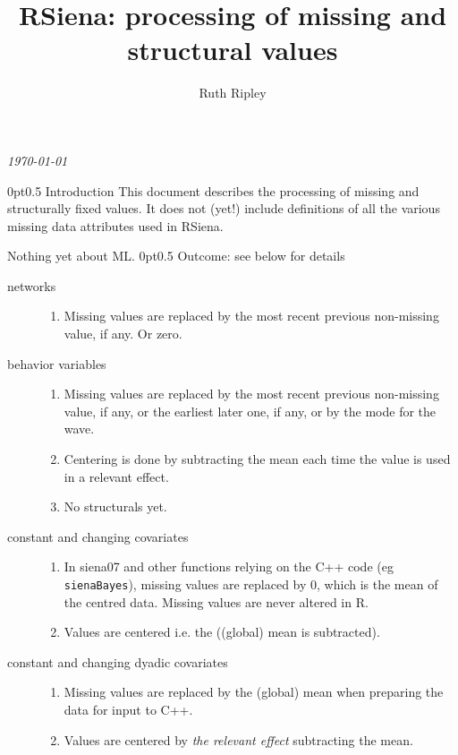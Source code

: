 \documentclass[12pt,a4paper]{article}
\makeatletter
\renewcommand{\=}{\,=\,}
\newcommand{\+}{\,+\,}
\renewcommand{\section}{\@startsection{section}{1}
                {0pt}{\baselineskip}{0.5\baselineskip}
                {\centering\sffamily} }
\makeatother
\begin{document}
\title{RSiena: processing of missing and structural values}
\author{Ruth Ripley}
\date{}
\maketitle

\centerline{\emph{\today}}
\bigskip
\section{Introduction}
This document describes the processing of missing and structurally fixed
values. It does not (yet!) include definitions of all the various missing data
attributes used in RSiena.

Nothing yet about ML.
\section{Outcome: see below for details}
\begin{description}
\item[networks]\hfill
\begin{enumerate}
\item Missing values are replaced by the most recent previous non-missing value,
  if any. Or zero.
\end{enumerate}
\item[behavior variables]\hfill
\begin{enumerate}
\item Missing values are replaced by the most recent previous non-missing value,
  if any, or the earliest later one, if any, or by the mode for the wave.
\item Centering is done by subtracting the mean each time the value is
  used in a relevant effect.
\item No structurals yet.
\end{enumerate}
\item[constant and changing covariates] \hfill
\begin{enumerate}
\item In siena07 and other functions relying on the C++ code (eg
  \verb|sienaBayes|), missing values are replaced by 0, which is the mean of the
  centred data. Missing values are never altered in R.
\item Values are centered i.e. the ((global) mean is
  subtracted).
\end{enumerate}
\item[constant and changing dyadic covariates]\hfill
\begin{enumerate}
\item Missing values are replaced by the (global) mean when preparing the data
  for input to C++.
\item Values are centered by \emph{the relevant effect} subtracting the mean.
\end{enumerate}
\end{description}
\end{document}
